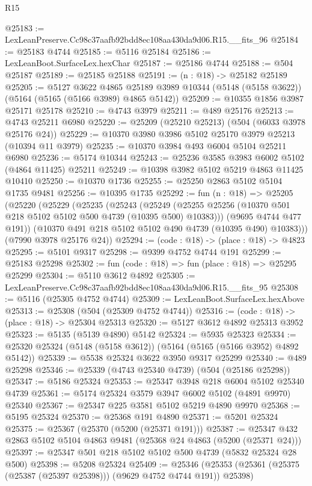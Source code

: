\begin{lexlean}{R15}
\begin{coremodule}
{{{{{{{{{{{@25183 := LexLeanPreserve.Cc98c37aafb92bdd8ec108aa430da9d06.R15.__fits_96
@25184 := @25183 @4744
@25185 := @5116 @25184
@25186 := LexLeanBoot.SurfaceLex.hexChar
@25187 := @25186 @4744
@25188 := @504 @25187
@25189 := @25185 @25188
@25191 := (n : @18) -> @25182 @25189
@25205 := @5127
    @3622
    @4865
    @25189
    @3989
    @10344
    (@5148 (@5158 @3622))
    (@5164 (@5165 (@5166 @3989) @4865 @5142))
@25209 := @10355 @1856 @3987 @25171 @25178
@25210 := @4743 @3979
@25211 := @489 @25176
@25213 := @4743 @25211 @6980
@25220 := @25209 (@25210 @25213) (@504 (@6033 @3978 @25176 @24))
@25229 := @10370 @3980 @3986 @5102 @25170 @3979 @25213 (@10394 @11 @3979)
@25235 := @10370 @3984 @493 @6004 @5104 @25211 @6980
@25236 := @5174 @10344
@25243 := @25236 @3585 @3983 @6002 @5102 (@4864 @11425) @25211
@25249 := @10398 @3982 @5102 @5219 @4863 @11425 @10410
@25250 := @10370 @1736
@25255 := @25250 @2863 @5102 @5104 @1735 @9481
@25256 := @10395 @1735
@25292 := fun (n : @18) =>
  @25205
    (@25220
      (@25229
        (@25235
          (@25243
            (@25249 (@25255 @25256 (@10370 @501 @218 @5102 @5102 @500 @4739 (@10395 @500) @10383)))
            (@9695 @4744 @477 @191))
          (@10370 @491 @218 @5102 @5102 @490 @4739 (@10395 @490) @10383)))
      (@7990 @3978 @25176 @24))
@25294 := (code : @18) -> (place : @18) -> @4823
@25295 := @5101 @9317
@25298 := @9399 @4752 @4744 @191
@25299 := @25183 @25298
@25302 := fun (code : @18) => fun (place : @18) => @25295 @25299
@25304 := @5110 @3612 @4892
@25305 := LexLeanPreserve.Cc98c37aafb92bdd8ec108aa430da9d06.R15.__fits_95
@25308 := @5116 (@25305 @4752 @4744)
@25309 := LexLeanBoot.SurfaceLex.hexAbove
@25313 := @25308 (@504 (@25309 @4752 @4744))
@25316 := (code : @18) -> (place : @18) -> @25304 @25313
@25320 := @5127 @3612 @4892 @25313 @3952
@25323 := @5135 (@5139 @4890) @5142
@25324 := @5935 @25323
@25334 := @25320 @25324 (@5148 (@5158 @3612)) (@5164 (@5165 (@5166 @3952) @4892 @5142))
@25339 := @5538 @25324 @3622 @3950 @9317 @25299
@25340 := @489 @25298
@25346 := @25339 (@4743 @25340 @4739) (@504 (@25186 @25298))
@25347 := @5186 @25324
@25353 := @25347 @3948 @218 @6004 @5102 @25340 @4739
@25361 := @5174 @25324 @3579 @3947 @6002 @5102 (@4891 @9970) @25340
@25367 := @25347 @225 @3581 @5102 @5219 @4890 @9970
@25368 := @5195 @25324
@25370 := @25368 @191 @4890
@25371 := @5201 @25324
@25375 := @25367 (@25370 (@5200 (@25371 @191)))
@25387 := @25347 @432 @2863 @5102 @5104 @4863 @9481 (@25368 @24 @4863 (@5200 (@25371 @24)))
@25397 := @25347 @501 @218 @5102 @5102 @500 @4739 (@5832 @25324 @28 @500)
@25398 := @5208 @25324
@25409 := @25346 (@25353 (@25361 (@25375 (@25387 (@25397 @25398))) (@9629 @4752 @4744 @191)) @25398)
}}}}}}}}}}}
\end{coremodule}
\end{lexlean}
